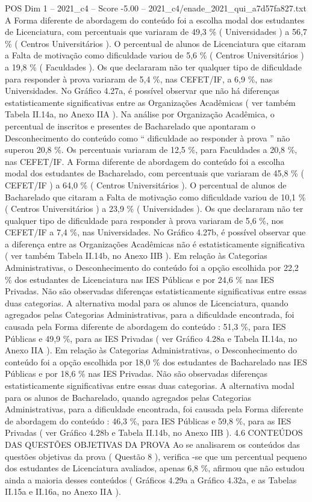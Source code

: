 \begin{textsample}{POS Dim 1 – 2021\_c4 – Score -5.00 – 2021\_c4/enade\_2021\_qui\_a7d57fa827.txt}
A Forma diferente de abordagem do conteúdo foi a escolha modal dos estudantes de Licenciatura, com percentuais que variaram de 49,3 \% ( Universidades ) a 56,7 \% ( Centros Universitários ).
O percentual de alunos de Licenciatura que citaram a Falta de motivação como dificuldade variou de 5,6 \% ( Centros Universitários ) a 19,8 \% ( Faculdades ).
Os que declararam não ter qualquer tipo de dificuldade para responder à prova variaram de 5,4 \%, nas CEFET/IF, a 6,9 \%, nas Universidades.
No Gráfico 4.27a, é possível observar que não há diferenças estatisticamente significativas entre as Organizações Acadêmicas ( ver também Tabela II.14a, no Anexo IIA ).
Na análise por Organização Acadêmica, o percentual de inscritos e presentes de Bacharelado que apontaram o Desconhecimento do conteúdo como “ dificuldade ao responder à prova ” não superou 20,8 \%.
Os percentuais variaram de 12,5 \%, para Faculdades a 20,8 \%, nas CEFET/IF.
A Forma diferente de abordagem do conteúdo foi a escolha modal dos estudantes de Bacharelado, com percentuais que variaram de 45,8 \% ( CEFET/IF ) a 64,0 \% ( Centros Universitários ).
O percentual de alunos de Bacharelado que citaram a Falta de motivação como dificuldade variou de 10,1 \% ( Centros Universitários ) a 23,9 \% ( Universidades ).
Os que declararam não ter qualquer tipo de dificuldade para responder à prova variaram de 5,6 \%, nos CEFET/IF a 7,4 \%, nas Universidades.
No Gráfico 4.27b, é possível observar que a diferença entre as Organizações Acadêmicas não é estatisticamente significativa ( ver também Tabela II.14b, no Anexo IIB ).
Em relação às Categorias Administrativas, o Desconhecimento do conteúdo foi a opção escolhida por 22,2 \% dos estudantes de Licenciatura nas IES Públicas e por 24,6 \% nas IES Privadas.
Não são observadas diferenças estatisticamente significativas entre essas duas categorias.
A alternativa modal para os alunos de Licenciatura, quando agregados pelas Categorias Administrativas, para a dificuldade encontrada, foi causada pela Forma diferente de abordagem do conteúdo : 51,3 \%, para IES Públicas e 49,9 \%, para as IES Privadas ( ver Gráfico 4.28a e Tabela II.14a, no Anexo IIA ).
Em relação às Categorias Administrativas, o Desconhecimento do conteúdo foi a opção escolhida por 18,0 \% dos estudantes de Bacharelado nas IES Públicas e por 18,6 \% nas IES Privadas.
Não são observadas diferenças estatisticamente significativas entre essas duas categorias.
A alternativa modal para os alunos de Bacharelado, quando agregados pelas Categorias Administrativas, para a dificuldade encontrada, foi causada pela Forma diferente de abordagem do conteúdo : 46,3 \%, para IES Públicas e 59,8 \%, para as IES Privadas ( ver Gráfico 4.28b e Tabela II.14b, no Anexo IIB ). 4.6 CONTEÚDOS DAS QUESTÕES OBJETIVAS DA PROVA Ao se analisarem os conteúdos das questões objetivas da prova ( Questão 8 ), verifica -se que um percentual pequeno dos estudantes de Licenciatura avaliados, apenas 6,8 \%, afirmou que não estudou ainda a maioria desses conteúdos ( Gráficos 4.29a a Gráfico 4.32a, e as Tabelas II.15a e II.16a, no Anexo IIA ).

\end{textsample}

